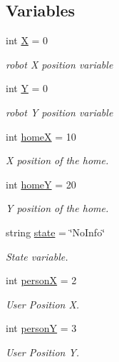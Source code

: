 \subsection*{Variables}
\begin{DoxyCompactItemize}
\item 
int \hyperlink{namespacecommandManager_af232742df3203418fc63619d6fdbbd7d}{X} = 0
\begin{DoxyCompactList}\small\item\em robot X position variable \end{DoxyCompactList}\item 
int \hyperlink{namespacecommandManager_a724d5ba6dbd057b575e254a1abbb8b63}{Y} = 0
\begin{DoxyCompactList}\small\item\em robot Y position variable \end{DoxyCompactList}\item 
int \hyperlink{namespacecommandManager_afd4e45cbe13ed5ee1c795062ed21e184}{homeX} = 10
\begin{DoxyCompactList}\small\item\em X position of the home. \end{DoxyCompactList}\item 
int \hyperlink{namespacecommandManager_a9deb4aa18f5f193991dbfb07d1f8e0b3}{homeY} = 20
\begin{DoxyCompactList}\small\item\em Y position of the home. \end{DoxyCompactList}\item 
string \hyperlink{namespacecommandManager_ad20ad550a7350517b8e1ce3dc95e3347}{state} = \char`\"{}No\+Info\char`\"{}
\begin{DoxyCompactList}\small\item\em State variable. \end{DoxyCompactList}\item 
int \hyperlink{namespacecommandManager_a6884642ee072d436560aca2420d14d62}{personX} = 2
\begin{DoxyCompactList}\small\item\em User Position X. \end{DoxyCompactList}\item 
int \hyperlink{namespacecommandManager_a765b4c6755570fef5702e26fede7b8e6}{personY} = 3
\begin{DoxyCompactList}\small\item\em User Position Y. \end{DoxyCompactList}\end{DoxyCompactItemize}


